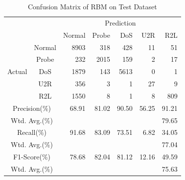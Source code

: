 \begin{table}[t]
    \caption{Confusion Matrix of RBM on Test Dataset}
    \centering
    \begin{tabular}{cc|rrrrr}
        \hline
        &  & \multicolumn{5}{c}{Prediction} \\
                        &        & Normal & Probe & DoS & U2R & R2L\\
        \hline
        \hline
        \multirow{5}{*}{Actual} & Normal & 8903 &  318 &  428 &  11 &   51 \\
                                & Probe  &  232 & 2015 &  159 &   2 &   17 \\
                                & DoS    & 1879 &  143 & 5613 &   0 &    1 \\
                                & U2R    &  356 &    3 &    1 &  27 &    9 \\
                                & R2L    & 1550 &    8 &    1 &   8 &  809 \\
        \hline
        \multicolumn{2}{c|}{Precision(\%)}   & 68.91& 81.02& 90.50& 56.25& 91.21\\
        \multicolumn{2}{c|}{Wtd. Avg.(\%)}   & \multicolumn{5}{r}{79.65}\\
        \hline
        \multicolumn{2}{c|}{Recall(\%)}      & 91.68& 83.09& 73.51&  6.82& 34.05\\
        \multicolumn{2}{c|}{Wtd. Avg.(\%)}   & \multicolumn{5}{r}{77.04}\\
        \hline
        \multicolumn{2}{c|}{F1-Score(\%)}    & 78.68& 82.04& 81.12& 12.16& 49.59\\
        \multicolumn{2}{c|}{Wtd. Avg.(\%)}   & \multicolumn{5}{r}{75.63}\\
        \hline
    \end{tabular}
    \label{Tab:ConfusionMatrixRBM}
\end{table}

